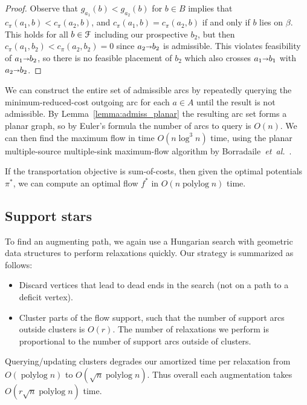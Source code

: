 \documentclass[a4paper,UKenglish]{socg-lipics-v2018}
\def\etal{\emph{et~al.}}
\def\etal{\textit{et~al.}}
\def\polylog{\mathop{\mathrm{polylog}}}
\def\arcto{\mathord\shortrightarrow}
\def\arc#1#2{#1\arcto#2}
\theoremstyle{plain}
\numberwithin{figure}{section}
\begin{document}
\begin{toappendix}
\begin{proof}
Observe that $g_{a_1}(b) < g_{a_2}(b)$ for $b \in B$ implies that
$c_\pi(a_1, b) < c_\pi(a_2, b)$, and $c_\pi(a_1, b) = c_\pi(a_2, b)$ if and
only if $b$ lies on $\beta$.
This holds for all $b \in \EuScript{F}$ including our prospective $b_2$,
but then $c_\pi(a_1, b_2) < c_\pi(a_2, b_2) = 0$ since $\arc{a_2}{b_2}$ is
admissible.
This violates feasibility of $\arc{a_1}{b_2}$, so there is no feasible
placement of $b_2$ which also crosses $\arc{a_1}{b_1}$ with $\arc{a_2}{b_2}$.
\end{proof}

We can construct the entire set of admissible arcs by repeatedly querying
the minimum-reduced-cost outgoing arc for each $a \in A$ until the result is
not admissible.
By Lemma~\ref{lemma:admiss_planar} the resulting arc set forms a planar graph,
so by Euler's formula the number of arcs to query is $O(n)$.
We can then find the maximum flow in time $O(n\log^3 n)$ time, using the
planar multiple-source multiple-sink maximum-flow algorithm by
Borradaile~\etal~\cite{BKMNW17}.

\begin{lemma}
If the transportation objective is sum-of-costs, then given the optimal
potentials $\pi^*$, we can compute an optimal flow $f^*$ in $O(n\polylog n)$
time.
\end{lemma}

\end{toappendix}


\subsection{Support stars}

To find an augmenting path, we again use a Hungarian search with geometric data
structures to perform relaxations quickly.
Our strategy is summarized as follows:
\begin{itemize}
\item Discard vertices that lead to dead ends in the search (not on a path
	to a deficit vertex).
\item Cluster parts of the flow support, such that the number of support arcs
	outside clusters is $O(r)$.
	The number of relaxations we perform is proportional to the number of
	support arcs outside of clusters.
\end{itemize}
Querying/updating clusters degrades our amortized time per relaxation from $O(\polylog n)$ to $O(\sqrt{n}\polylog n)$.
Thus overall each augmentation takes $O(r\sqrt{n}\polylog n)$ time.
\end{document}
